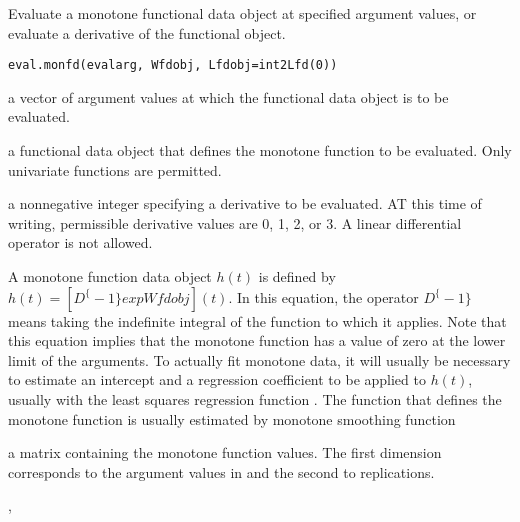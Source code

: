 \documentclass{article}
\begin{document}
\begin{Description}\relax
Evaluate a monotone functional data object at specified argument values,
or evaluate a derivative of the functional object.
\end{Description}
\begin{Usage}
\begin{verbatim}
eval.monfd(evalarg, Wfdobj, Lfdobj=int2Lfd(0))
\end{verbatim}
\end{Usage}
\begin{Arguments}
\begin{ldescription}
\item[\code{evalarg}] a vector of argument values at which the functional data object is to be
evaluated.

\item[\code{Wfdobj}] a functional data object that defines the monotone function to be
evaluated.  Only univariate functions are permitted.

\item[\code{Lfdobj}] a nonnegative integer specifying a derivative to be evaluated.  AT
this time of writing, permissible derivative values are 0, 1, 2, or 3.
A linear differential operator is not allowed.

\end{ldescription}
\end{Arguments}
\begin{Details}\relax
A monotone function data object $h(t)$ is defined by
$h(t) = [D^\{-1\} exp Wfdobj](t)$.  In this equation, the operator  $D^\{-1\}$ means
taking the indefinite integral of the function to which it applies.
Note that this equation implies that the monotone function has a value
of zero at the lower limit of the arguments.  To actually fit monotone
data, it will usually be necessary to estimate an intercept and a
regression coefficient to be applied to $h(t)$, usually with the
least squares regression function .
The function  that defines the monotone function is
usually estimated by monotone smoothing function
\end{Details}
\begin{Value}
a matrix containing the monotone function
values.  The first dimension corresponds to the argument values in
 and
the second to replications.
\end{Value}
\begin{SeeAlso}\relax
{},
\end{SeeAlso}
\end{document}
